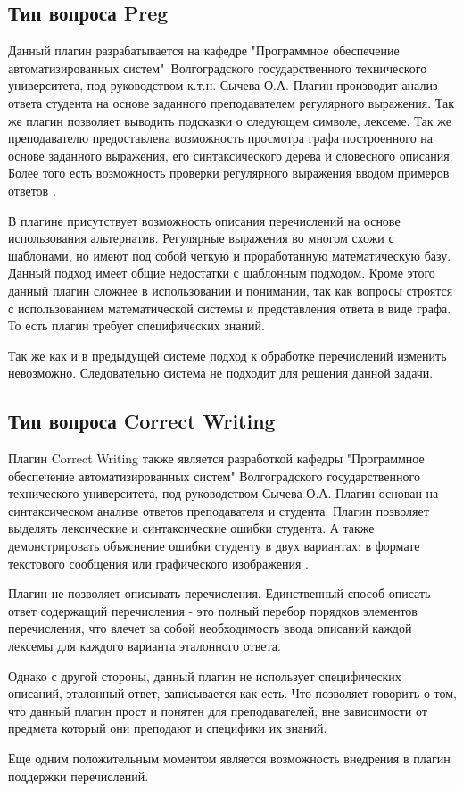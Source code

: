 \documentclass[a4paper,english,russian]{G2-105}
\begin{document}
\subsection{Тип вопроса Preg}

\par Данный плагин разрабатывается на кафедре "Программное обеспечение автоматизированных систем"\ Волгоградского государственного технического университета,  под руководством к.т.н. Сычева О.А. Плагин производит анализ ответа студента на основе заданного преподавателем регулярного выражения. Так же плагин позволяет выводить подсказки о следующем символе, лексеме. Так же преподавателю предоставлена возможность просмотра графа построенного на основе заданного выражения, его синтаксического дерева и словесного описания. Более того есть возможность проверки регулярного выражения вводом примеров ответов \cite{2}. 
\par В плагине присутствует возможность описания перечислений на основе использования альтернатив. Регулярные выражения во многом схожи с шаблонами, но имеют под собой четкую и проработанную математическую базу. Данный подход имеет общие недостатки с шаблонным подходом. Кроме этого данный плагин сложнее в использовании и понимании, так как вопросы строятся с использованием математической системы и представления ответа в виде графа. То есть плагин требует специфических знаний. 
\par Так же как и в предыдущей системе подход к обработке перечислений изменить невозможно. Следовательно система не подходит для решения данной задачи.

\subsection{Тип вопроса Correct Writing}

\par Плагин Correct Writing также является разработкой кафедры "Программное обеспечение автоматизированных систем" Волгоградского государственного технического университета, под руководством Сычева О.А. Плагин основан на синтаксическом анализе ответов преподавателя и студента. Плагин позволяет выделять лексические и синтаксические ошибки студента. А также демонстрировать объяснение ошибки студенту в двух вариантах: в формате текстового сообщения или графического изображения \cite{3,4}.
\par Плагин не позволяет описывать перечисления. Единственный способ описать ответ содержащий перечисления - это полный перебор порядков элементов перечисления, что влечет за собой необходимость ввода описаний каждой лексемы для каждого варианта эталонного ответа.
\par Однако с другой стороны, данный плагин не использует специфических описаний, эталонный ответ, записывается как есть. Что позволяет говорить о том, что данный плагин прост и понятен для преподавателей, вне зависимости от предмета который они преподают и специфики их знаний. 
\par Еще одним положительным моментом является возможность внедрения в плагин поддержки перечислений.
\end{document}
